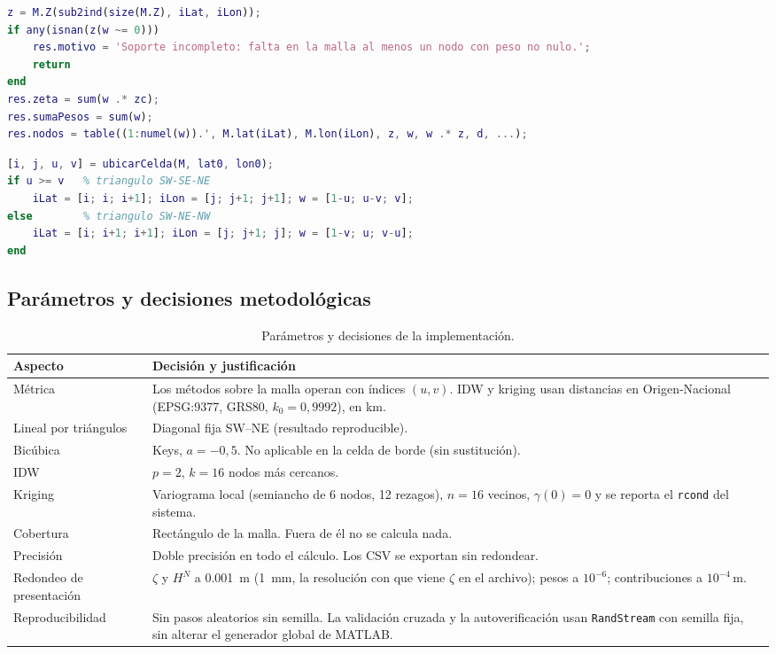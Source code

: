 \documentclass[11pt,letterpaper]{article}
\begin{document}
\begin{lstlisting}[language=Matlab, caption={Núcleo común: suma ponderada, suma de pesos y tabla de nodos (fragmento de \texttt{interpolarPunto}).}]
z = M.Z(sub2ind(size(M.Z), iLat, iLon));
if any(isnan(z(w ~= 0)))
    res.motivo = 'Soporte incompleto: falta en la malla al menos un nodo con peso no nulo.';
    return
end
res.zeta = sum(w .* zc);
res.sumaPesos = sum(w);
res.nodos = table((1:numel(w)).', M.lat(iLat), M.lon(iLon), z, w, w .* z, d, ...);
\end{lstlisting}

\begin{lstlisting}[language=Matlab, caption={Pesos de la interpolación lineal por triángulos con diagonal fija SW--NE (\texttt{pesosTriangulos}).}]
[i, j, u, v] = ubicarCelda(M, lat0, lon0);
if u >= v   % triangulo SW-SE-NE
    iLat = [i; i; i+1]; iLon = [j; j+1; j+1]; w = [1-u; u-v; v];
else        % triangulo SW-NE-NW
    iLat = [i; i+1; i+1]; iLon = [j; j+1; j]; w = [1-v; u; v-u];
end
\end{lstlisting}

\subsection{Parámetros y decisiones metodológicas}
\begin{table}[H]
\centering
\caption{Parámetros y decisiones de la implementación.}
\label{tab:parametros}
\small
\renewcommand{\arraystretch}{1.2}
\begin{tabular}{@{}p{3.6cm}p{11.6cm}@{}}
\toprule
Aspecto & Decisión y justificación \\
\midrule
Métrica & Los métodos sobre la malla operan con índices $(u,v)$. IDW y kriging usan
distancias en Origen-Nacional (EPSG:9377, GRS80, $k_0=0{,}9992$), en km. \\
Lineal por triángulos & Diagonal fija SW--NE (resultado reproducible). \\
Bicúbica & Keys, $a=-0{,}5$. No aplicable en la celda de borde (sin sustitución). \\
IDW & $p=2$, $k=16$ nodos más cercanos. \\
Kriging & Variograma local (semiancho de 6 nodos, 12 rezagos), $n=16$ vecinos,
$\gamma(0)=0$ y se reporta el \texttt{rcond} del sistema. \\
Cobertura & Rectángulo de la malla. Fuera de él no se calcula nada. \\
Precisión & Doble precisión en todo el cálculo. Los CSV se exportan sin redondear. \\
Redondeo de presentación & $\zeta$ y $H^N$ a \SI{0.001}{m} (\SI{1}{mm}, la resolución con que viene
$\zeta$ en el archivo); pesos a $10^{-6}$; contribuciones a $10^{-4}$\,m. \\
Reproducibilidad & Sin pasos aleatorios sin semilla. La validación cruzada y la autoverificación
usan \texttt{RandStream} con semilla fija, sin alterar el generador global de MATLAB. \\
\bottomrule
\end{tabular}
\end{table}
\end{document}

